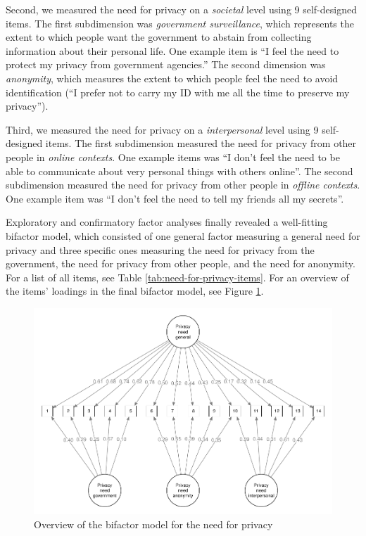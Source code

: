 \documentclass[man,floatsintext]{apa6}
\theoremstyle{definition}
\theoremstyle{definition}
\theoremstyle{definition}
\theoremstyle{remark}
\begin{document}
Second, we measured the need for privacy on a \emph{societal} level
using 9 self-designed items. The first subdimension was \emph{government
surveillance}, which represents the extent to which people want the
government to abstain from collecting information about their personal
life. One example item is \enquote{I feel the need to protect my privacy
from government agencies.} The second dimension was \emph{anonymity},
which measures the extent to which people feel the need to avoid
identification (\enquote{I prefer not to carry my ID with me all the
time to preserve my privacy}).

Third, we measured the need for privacy on a \emph{interpersonal} level
using 9 self-designed items. The first subdimension measured the need
for privacy from other people in \emph{online contexts}. One example
items was \enquote{I don't feel the need to be able to communicate about
very personal things with others online}. The second subdimension
measured the need for privacy from other people in \emph{offline
contexts}. One example item was \enquote{I don't feel the need to tell
my friends all my secrets}.

Exploratory and confirmatory factor analyses finally revealed a
well-fitting bifactor model, which consisted of one general factor
measuring a general need for privacy and three specific ones measuring
the need for privacy from the government, the need for privacy from
other people, and the need for anonymity. For a list of all items, see
Table \ref{tab:need-for-privacy-items}. For an overview of the items'
loadings in the final bifactor model, see Figure
\ref{fig:need-for-privacy-loadings}.

\begin{figure}
\centering
\includegraphics{manuscript_files/figure-latex/need-for-privacy-loadings-1.pdf}
\caption{\label{fig:need-for-privacy-loadings}Overview of the bifactor model
for the need for privacy}
\end{figure}
\end{document}
